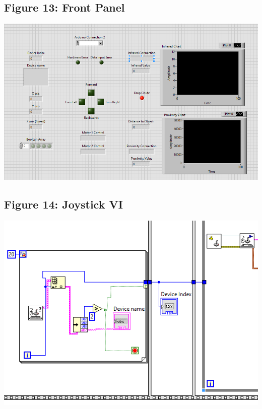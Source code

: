 \documentclass{article}
\begin{document}
\subsection{Figure 13: Front Panel}
\begin{center}{ \includegraphics[width=\textwidth]{FrontPanel.png}}\end{center}

\subsection{Figure 14: Joystick VI}
\begin{center}{ \includegraphics[width=\textwidth]{JoystickVI.png}}\end{center}
\end{document}
